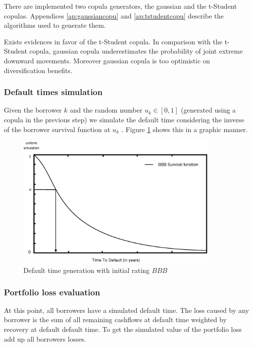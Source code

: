 \documentclass[a4paper,12pt,final]{article}
\begin{document}
There are implemented two copula generators, the gaussian and the t-Student
copulas. Appendices \ref{ap:gaussiancopu} and \ref{ap:tstudentcopu} describe the 
algorithms used to generate them.
\newline

Exists evidences \cite{copu:selecting} in favor of the t-Student copula. 
In comparison with the t-Student copula, gaussian copula underestimates the probability 
of joint extreme downward movements. Moreover gaussian copula is too optimistic on 
diversification benefits.

\subsubsection{Default times simulation}
\label{sec:deftimessim}
Given the borrower $k$ and the random number $u_k \in [0,1]$ (generated using a 
copula in the previous step) we simulate the default time considering the 
inverse of the borrower survival function at $u_k$ \cite{ref:cred_risk}. 
Figure \ref{simttd} shows this in a graphic manner.

\begin{figure}[!hbt]
\begin{center}
\includegraphics[width=10cm,angle=0]{./images/simttd.eps}
\caption{Default time generation with initial rating $BBB$}
\label{simttd}
\end{center}
\end{figure}
\FloatBarrier

\subsubsection{Portfolio loss evaluation}
\label{sec:portfolioloss}
At this point, all borrowers have a simulated default time. The loss
caused by any borrower is the sum of all remaining cashflows at default time 
weighted by recovery at default default time. To get the simulated 
value of the portfolio loss add up all borrowers losses.
\end{document}
